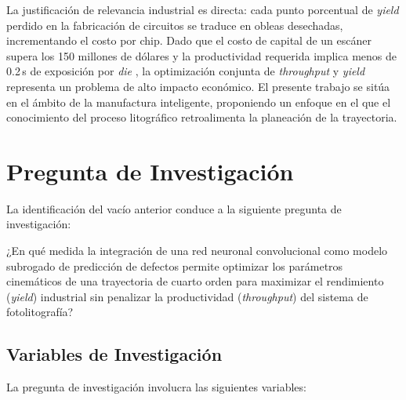 \documentclass[11pt]{article}
\theoremstyle{definition}
\begin{document}
La justificación de relevancia industrial es directa: cada punto porcentual de \textit{yield} perdido en la fabricación de circuitos se traduce en obleas desechadas, incrementando el costo por chip. Dado que el costo de capital de un escáner supera los 150 millones de dólares y la productividad requerida implica menos de 0.2\,s de exposición por \textit{die} \supercite{Butler2011_PositionControl}, la optimización conjunta de \textit{throughput} y \textit{yield} representa un problema de alto impacto económico. El presente trabajo se sitúa en el ámbito de la manufactura inteligente, proponiendo un enfoque en el que el conocimiento del proceso litográfico retroalimenta la planeación de la trayectoria.

\section{Pregunta de Investigación}

La identificación del vacío anterior conduce a la siguiente pregunta de investigación:

\begin{framed}
¿En qué medida la integración de una red neuronal convolucional como modelo subrogado de predicción de defectos permite optimizar los parámetros cinemáticos de una trayectoria de cuarto orden para maximizar el rendimiento (\textit{yield}) industrial sin penalizar la productividad (\textit{throughput}) del sistema de fotolitografía?
\end{framed}

\subsection{Variables de Investigación}

La pregunta de investigación involucra las siguientes variables:
\end{document}
